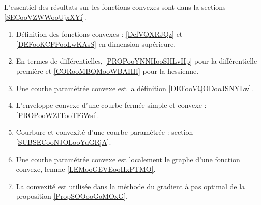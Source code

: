 
L'essentiel des résultats sur les fonctions convexes sont dans la sections \ref{SECooVZWWooUjxXYi}.

\begin{enumerate}
    \item
        Définition des fonctions convexes : \ref{DefVQXRJQz} et \ref{DEFooKCFPooLwKAsS} en dimension supérieure.
    \item 
        En termes de différentielles, \ref{PROPooYNNHooSHLvHp} pour la différentielle première et \ref{CORooMBQMooWBAIIH} pour la hessienne.
    \item
        Une courbe paramétrée convexe est la définition \ref{DEFooVQODooJSNYLw}.
    \item
        L'enveloppe convexe d'une courbe fermée simple et convexe : \ref{PROPooWZITooTFiWsi}.
    \item 
        Courbure et convexité d'une courbe paramétrée : section \ref{SUBSECooNJOLooYuGRjA}.
    \item
        Une courbe paramétrée convexe est localement le graphe d'une fonction convexe, lemme \ref{LEMooGEVEooHxPTMO}.
    \item
        La convexité est utilisée dans la méthode du gradient à pas optimal de la proposition \ref{PropSOOooGoMOxG}.
\end{enumerate}
